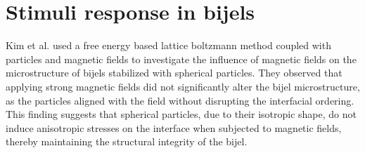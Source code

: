 


\section{Stimuli response in bijels}

Kim et al. used a free energy based lattice boltzmann method coupled with particles and magnetic fields to investigate the influence of magnetic fields on 
the microstructure of bijels stabilized with spherical particles. \cite{kim_bijels_2010}
They observed that applying strong magnetic fields did not significantly alter the bijel microstructure, as the particles aligned with 
the field without disrupting the interfacial ordering. This finding suggests that spherical particles, due to their isotropic shape, do 
not induce anisotropic stresses on the interface when subjected to magnetic fields, thereby maintaining the structural integrity of the bijel.

